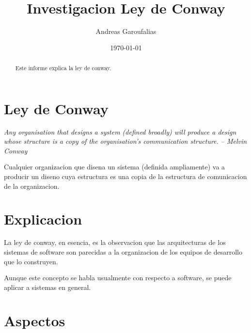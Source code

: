 \documentclass[11pt]{article}
\title{Investigacion Ley de Conway}
\author{Andreas Garoufalias}
\date{\today}
\begin{document}
\maketitle

\begin{abstract}
	Este informe explica la ley de conway.
\end{abstract}

\section{Ley de Conway}

\textit{Any organisation that designs a system (defined broadly) will produce a design whose structure is a copy of the organisation's communication structure. -- Melvin Conway}

Cualquier organizacion que disena un sistema (definida ampliamente) va a producir un diseno cuya estructura es una copia de la estructura de comunicacion de la organizacion.

\section{Explicacion}

La ley de conway, en esencia, es la observacion que las arquitecturas de los sistemas de software son parecidas a la organizacion de los equipos de desarrollo que lo construyen.

Aunque este concepto se habla usualmente con respecto a software, se puede aplicar a sistemas en general.

\section{Aspectos}
\end{document}
